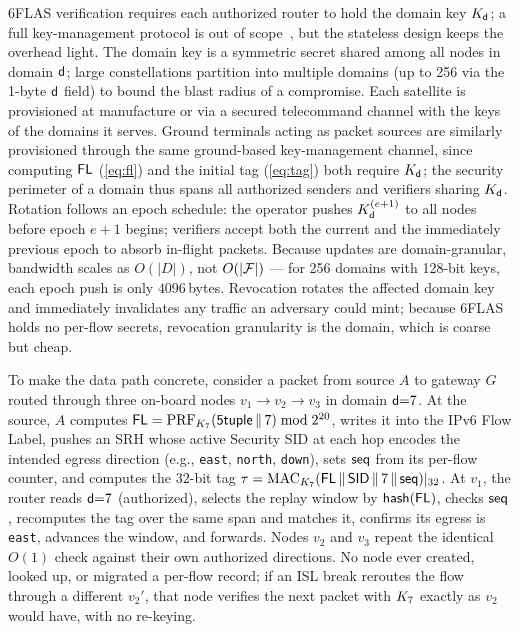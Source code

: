 6FLAS verification requires each authorized router to hold the domain key
$K_{\mathsf{d}}$; a full key-management protocol is out of scope~\cite{tan2025crossdomain},
but the stateless design keeps the overhead light. The domain key is a symmetric
secret shared among all nodes in domain $\mathsf{d}$; large constellations partition
into multiple domains (up to 256 via the 1-byte $\mathsf{d}$ field) to bound the
blast radius of a compromise. Each satellite is provisioned at manufacture or via
a secured telecommand channel with the keys of the domains it serves.
Ground terminals acting as packet sources are similarly provisioned through
the same ground-based key-management channel, since computing $\mathsf{FL}$
(\cref{eq:fl}) and the initial tag (\cref{eq:tag}) both require $K_{\mathsf{d}}$;
the security perimeter of a domain thus spans all authorized senders and
verifiers sharing $K_{\mathsf{d}}$. Rotation
follows an epoch schedule: the operator pushes $K_{\mathsf{d}}^{(e+1)}$ to all
nodes before epoch $e{+}1$ begins; verifiers accept both the current and the
immediately previous epoch to absorb in-flight packets. Because updates are
domain-granular, bandwidth scales as $O(|D|)$, not $O(|\mathcal{F}|)$ — for 256
domains with 128-bit keys, each epoch push is only $4096$\,bytes. Revocation
rotates the affected domain key and immediately invalidates any traffic an
adversary could mint; because 6FLAS holds no per-flow secrets, revocation
granularity is the domain, which is coarse but cheap.

To make the data path concrete, consider a packet from source $A$ to gateway $G$
routed through three on-board nodes $v_1{\to}v_2{\to}v_3$ in domain
$\mathsf{d}{=}7$. At the source, $A$ computes
$\mathsf{FL}=\operatorname{PRF}_{K_7}(\textsf{5tuple}\,\|\,7)\bmod 2^{20}$, writes it into the
IPv6 Flow Label, pushes an SRH whose active Security SID at each hop encodes the
intended egress direction (e.g., \texttt{east}, \texttt{north}, \texttt{down}),
sets $\mathsf{seq}$ from its per-flow counter, and computes the $32$-bit tag
$\tau=\operatorname{MAC}_{K_7}(\mathsf{FL}\,\|\,\textsf{SID}\,\|\,7\,\|\,\mathsf{seq})|_{32}$. At $v_1$,
the router reads $\mathsf{d}{=}7$ (authorized), selects the replay window by
$\textsf{hash}(\mathsf{FL})$, checks $\mathsf{seq}$, recomputes the tag over the same span and
matches it, confirms its egress is \texttt{east}, advances the window, and
forwards. Nodes $v_2$ and $v_3$ repeat the identical $O(1)$ check against their
own authorized directions. No node ever created, looked up, or migrated a
per-flow record; if an ISL break reroutes the flow through a different $v_2'$,
that node verifies the next packet with $K_7$ exactly as $v_2$ would have,
with no re-keying.
